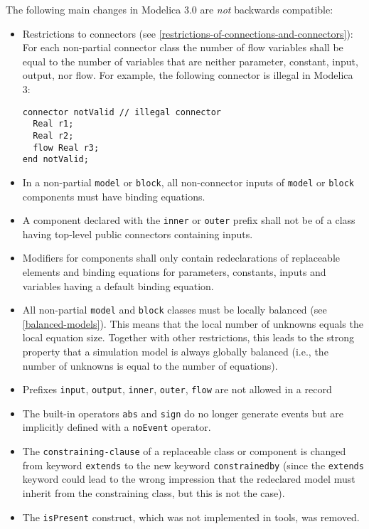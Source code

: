The following main changes in Modelica 3.0 are \emph{not} backwards compatible:
\begin{itemize}
\item
  Restrictions to connectors (see \cref{restrictions-of-connections-and-connectors}): For each non-partial
  connector class the number of flow variables shall be equal to the
  number of variables that are neither parameter, constant, input,
  output, nor flow. For example, the following connector is illegal in
  Modelica 3:
\begin{lstlisting}[language=modelica]
connector notValid // illegal connector
  Real r1;
  Real r2;
  flow Real r3;
end notValid;
\end{lstlisting}
\item
  In a non-partial \lstinline!model! or \lstinline!block!, all non-connector inputs of \lstinline!model! or \lstinline!block! components must have binding equations.
\item
  A component declared with the \lstinline!inner! or \lstinline!outer! prefix shall not be of a
  class having top-level public connectors containing inputs.
\item
  Modifiers for components shall only contain redeclarations of
  replaceable elements and binding equations for parameters, constants,
  inputs and variables having a default binding equation.
\item
  All non-partial \lstinline!model! and \lstinline!block! classes must be locally balanced (see \cref{balanced-models}).  This means that the local number of unknowns equals the local equation size. Together with other restrictions, this leads to the strong property that a simulation model is always globally balanced (i.e., the number of unknowns is equal to the number of equations).
\item
  Prefixes \lstinline!input!, \lstinline!output!, \lstinline!inner!, \lstinline!outer!, \lstinline!flow! are not allowed in a record
\item
  The built-in operators \lstinline!abs! and \lstinline!sign! do no longer
  generate events but are implicitly defined with a \lstinline!noEvent!
  operator.
\item
  The \lstinline[language=grammar]!constraining-clause! of a replaceable class or component is changed from keyword \lstinline!extends! to the new keyword \lstinline!constrainedby! (since the \lstinline!extends! keyword could lead to the wrong impression that the redeclared model must inherit from the constraining class, but this is not the case).
\item
  The \lstinline!isPresent! construct, which was not implemented in tools, was removed.
\end{itemize}

